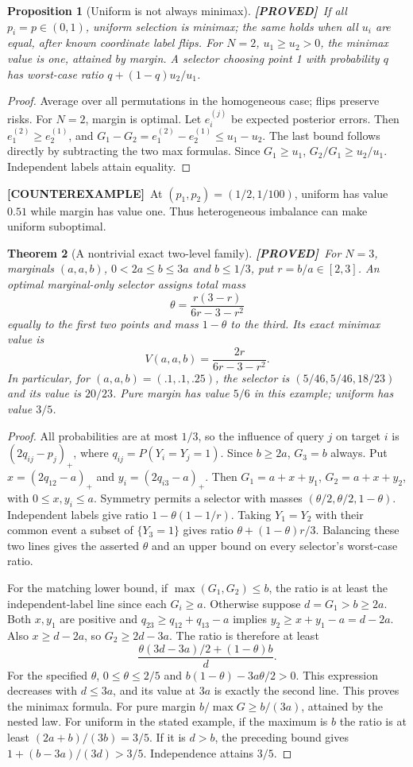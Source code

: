 \documentclass[11pt]{article}
\newtheorem{theorem}{Theorem}[section]
\newtheorem{proposition}[theorem]{Proposition}
\theoremstyle{definition}
\newcommand{\1}{\mathbf 1}
\newcommand{\pr}{\textbf{[PROVED]}}
\newcommand{\ce}{\textbf{[COUNTEREXAMPLE]}}
\begin{document}
\begin{proposition}[Uniform is not always minimax]\label{prop:uniform}
\pr\ If all $p_i=p\in(0,1)$, uniform selection is minimax; the same holds
when all $u_i$ are equal, after known coordinate label flips.
For $N=2$, $u_1\ge u_2>0$, the minimax value is one, attained by margin.
A selector choosing point 1 with probability $q$ has worst-case ratio
$q+(1-q)u_2/u_1$.
\end{proposition}
\begin{proof}
Average over all permutations in the homogeneous case; flips preserve risks.
For $N=2$, margin is optimal. Let $e_i^{(j)}$ be expected posterior errors.
Then $e_1^{(2)}\ge e_2^{(1)}$, and
$G_1-G_2=e_1^{(2)}-e_2^{(1)}\le u_1-u_2$.
The last bound follows directly by subtracting the two max formulas.
Since $G_1\ge u_1$, $G_2/G_1\ge u_2/u_1$.
Independent labels attain equality.
\end{proof}
\ce\ At $(p_1,p_2)=(1/2,1/100)$, uniform has value $0.51$ while margin has
value one. Thus heterogeneous imbalance can make uniform suboptimal.

\begin{theorem}[A nontrivial exact two-level family]\label{th:twolevel}
\pr\ For $N=3$, marginals $(a,a,b)$, $0<2a\le b\le3a$ and $b\le1/3$,
put $r=b/a\in[2,3]$. An optimal marginal-only selector assigns total mass
\[
 \theta=\frac{r(3-r)}{6r-3-r^2}
\]
equally to the first two points and mass $1-\theta$ to the third.
Its exact minimax value is
\[
 V(a,a,b)=\frac{2r}{6r-3-r^2}.
\]
In particular, for $(a,a,b)=(.1,.1,.25)$, the selector is
$(5/46,5/46,18/23)$ and its value is $20/23$.
Pure margin has value $5/6$ in this example; uniform has value $3/5$.
\end{theorem}
\begin{proof}
All probabilities are at most $1/3$, so the influence of query $j$ on
target $i$ is $(2q_{ij}-p_j)_+$, where $q_{ij}=P(Y_i=Y_j=1)$.
Since $b\ge2a$, $G_3=b$ always. Put
$x=(2q_{12}-a)_+$ and $y_i=(2q_{i3}-a)_+$.
Then $G_1=a+x+y_1$, $G_2=a+x+y_2$, with $0\le x,y_i\le a$.
Symmetry permits a selector with masses $(\theta/2,\theta/2,1-\theta)$.
Independent labels give ratio $1-\theta(1-1/r)$.
Taking $Y_1=Y_2$ with their common event a subset of $\{Y_3=1\}$ gives
ratio $\theta+(1-\theta)r/3$.
Balancing these two lines gives the asserted $\theta$ and an upper bound
on every selector's worst-case ratio.

For the matching lower bound, if $\max(G_1,G_2)\le b$, the ratio is at
least the independent-label line since each $G_i\ge a$.
Otherwise suppose $d=G_1>b\ge2a$. Both $x,y_1$ are positive and
$q_{23}\ge q_{12}+q_{13}-a$ implies
$y_2\ge x+y_1-a=d-2a$.
Also $x\ge d-2a$, so $G_2\ge2d-3a$.
The ratio is therefore at least
\[
 \frac{\theta(3d-3a)/2+(1-\theta)b}{d}.
\]
For the specified $\theta$, $0\le\theta\le2/5$ and
$b(1-\theta)-3a\theta/2>0$.
This expression decreases with $d\le3a$, and its value at $3a$ is exactly
the second line. This proves the minimax formula.
For pure margin $b/\max G\ge b/(3a)$, attained by the nested law.
For uniform in the stated example, if the maximum is $b$ the ratio is at
least $(2a+b)/(3b)=3/5$. If it is $d>b$, the preceding bound gives
$1+(b-3a)/(3d)>3/5$. Independence attains $3/5$.
\end{proof}
\end{document}
